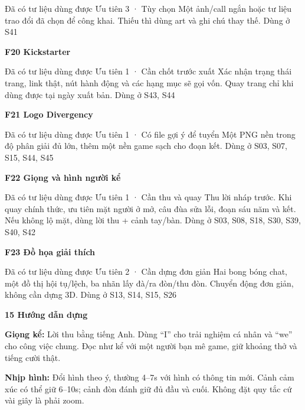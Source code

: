 \documentclass[10pt,a4paper]{article}
\begin{document}
Đã có tư liệu dùng được Ưu tiên 3 · Tùy chọn Một ảnh/call ngắn hoặc tư liệu trao đổi đã chọn để công khai. Thiếu thì dùng art và ghi chú thay thế. Dùng ở S41\par

\textbf{F20 Kickstarter}\par

Đã có tư liệu dùng được Ưu tiên 1 · Cần chốt trước xuất Xác nhận trạng thái trang, link thật, nút hành động và các hạng mục sẽ gọi vốn. Quay trang chỉ khi dùng được tại ngày xuất bản. Dùng ở S43, S44\par

\textbf{F21 Logo Divergency}\par

Đã có tư liệu dùng được Ưu tiên 1 · Có file gợi ý để tuyển Một PNG nền trong độ phân giải đủ lớn, thêm một nền game sạch cho đoạn kết. Dùng ở S03, S07, S15, S44, S45\par

\clearpage

\textbf{F22 Giọng và hình người kể}\par

Đã có tư liệu dùng được Ưu tiên 1 · Cần thu và quay Thu lời nháp trước. Khi quay chính thức, ưu tiên mặt người ở mở, câu đùa sửa lỗi, đoạn sáu năm và kết. Nếu không lộ mặt, dùng lời thu + cảnh tay/bàn. Dùng ở S03, S08, S18, S30, S39, S40, S42\par

\textbf{F23 Đồ họa giải thích}\par

Đã có tư liệu dùng được Ưu tiên 2 · Cần dựng đơn giản Hai bong bóng chat, một đồ thị hội tụ/lệch, ba nhãn lấy đà/ra đòn/thu đòn. Chuyển động đơn giản, không cần dựng 3D. Dùng ở S13, S14, S15, S26\par

\textbf{15 Hướng dẫn dựng}\par

\textbf{Giọng kể:}  Lời thu bằng tiếng Anh. Dùng “I” cho trải nghiệm cá nhân và “we” cho công việc chung. Đọc như kể với một người bạn mê game, giữ khoảng thở và tiếng cười thật.\par

\textbf{Nhịp hình:}  Đổi hình theo ý, thường 4–7s với hình có thông tin mới. Cảnh cảm xúc có thể giữ 6–10s; cảnh đòn đánh giữ đủ đầu và cuối. Không đặt quy tắc cứ vài giây là phải zoom.\par
\end{document}
